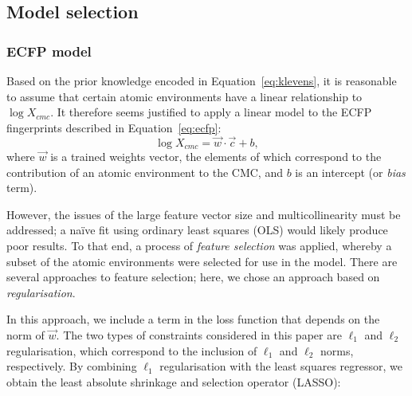 \subsection{Model selection}

\subsubsection{ECFP model}

Based on the prior knowledge encoded in Equation~\ref{eq:klevens}, it is
reasonable to assume that certain atomic environments have a linear relationship
to $\log X_{cmc}$. It therefore seems justified to apply a linear model to the
ECFP fingerprints described in Equation~\ref{eq:ecfp}:
\begin{equation}
    \log X_{cmc} = \vec{w} \cdot \vec{c} + b,
\end{equation}
where $\vec{w}$ is a trained weights vector, the elements of which correspond to
the contribution of an atomic environment to the CMC, and $b$ is an intercept
(or \emph{bias} term).

However, the issues of the large feature vector size and multicollinearity must
be addressed; a na\"ive fit using ordinary least squares (OLS) would likely
produce poor results. To that end, a process of \emph{feature selection} was
applied, whereby a subset of the atomic environments were selected for use in
the model. There are several approaches to feature
selection\cite{liFeatureSelectionData2017}; here, we chose an approach based on
\emph{regularisation}.

In this approach, we include a term in the loss function that depends on the
norm of $\vec{w}$. The two types of constraints considered in this paper are
$\ell_1$ and $\ell_2$ regularisation, which correspond to the inclusion of
$\ell_1$ and $\ell_2$ norms, respectively. By combining $\ell_1$ regularisation
with the least squares regressor, we obtain the least absolute shrinkage and
selection operator (LASSO)\cite{tibshiraniRegressionShrinkageSelection1996}:

